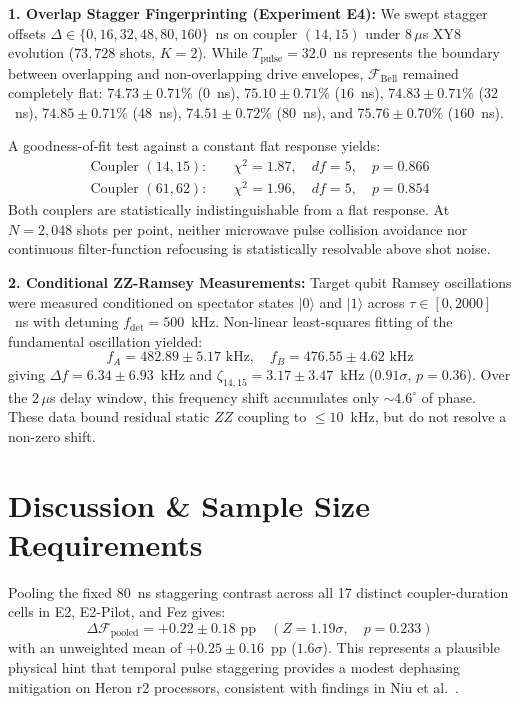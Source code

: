 \documentclass[aps,prl,twocolumn,amsmath,amssymb,superscriptaddress,floatfix]{revtex4-2}
\begin{document}
\textbf{1. Overlap Stagger Fingerprinting (Experiment E4):} We swept stagger offsets $\Delta \in \{0, 16, 32, 48, 80, 160\}$~ns on coupler $(14, 15)$ under $8\,\mu$s XY8 evolution ($73,728$ shots, $K = 2$). While $T_{\text{pulse}} = 32.0$~ns represents the boundary between overlapping and non-overlapping drive envelopes, $\mathcal{F}_{\text{Bell}}$ remained completely flat: $74.73 \pm 0.71\%$ ($0$~ns), $75.10 \pm 0.71\%$ ($16$~ns), $74.83 \pm 0.71\%$ ($32$~ns), $74.85 \pm 0.71\%$ ($48$~ns), $74.51 \pm 0.72\%$ ($80$~ns), and $75.76 \pm 0.70\%$ ($160$~ns). 

A goodness-of-fit test against a constant flat response yields:
\begin{align}
\text{Coupler }(14, 15): &\quad \chi^2 = 1.87, \quad df = 5, \quad p = 0.866 \\
\text{Coupler }(61, 62): &\quad \chi^2 = 1.96, \quad df = 5, \quad p = 0.854
\end{align}
Both couplers are statistically indistinguishable from a flat response. At $N = 2,048$ shots per point, neither microwave pulse collision avoidance nor continuous filter-function refocusing is statistically resolvable above shot noise.

\textbf{2. Conditional ZZ-Ramsey Measurements:} Target qubit Ramsey oscillations were measured conditioned on spectator states $|0\rangle$ and $|1\rangle$ across $\tau \in [0, 2000]$~ns with detuning $f_{\text{det}} = 500$~kHz. Non-linear least-squares fitting of the fundamental oscillation yielded:
\begin{equation}
f_A = 482.89 \pm 5.17\text{ kHz}, \quad f_B = 476.55 \pm 4.62\text{ kHz}
\end{equation}
giving $\Delta f = 6.34 \pm 6.93$~kHz and $\zeta_{14,15} = 3.17 \pm 3.47$~kHz ($0.91\sigma$, $p = 0.36$). Over the $2\,\mu$s delay window, this frequency shift accumulates only $\sim 4.6^\circ$ of phase. These data bound residual static $ZZ$ coupling to $\le 10$~kHz, but do not resolve a non-zero shift.

\section{Discussion \& Sample Size Requirements}
Pooling the fixed $80$~ns staggering contrast across all 17 distinct coupler-duration cells in E2, E2-Pilot, and Fez gives:
\begin{equation}
\Delta \mathcal{F}_{\text{pooled}} = +0.22 \pm 0.18\text{ pp} \quad (Z = 1.19\sigma, \quad p = 0.233)
\end{equation}
with an unweighted mean of $+0.25 \pm 0.16$~pp ($1.6\sigma$). This represents a plausible physical hint that temporal pulse staggering provides a modest dephasing mitigation on Heron r2 processors, consistent with findings in Niu et al.~\cite{Niu2024}.
\end{document}
